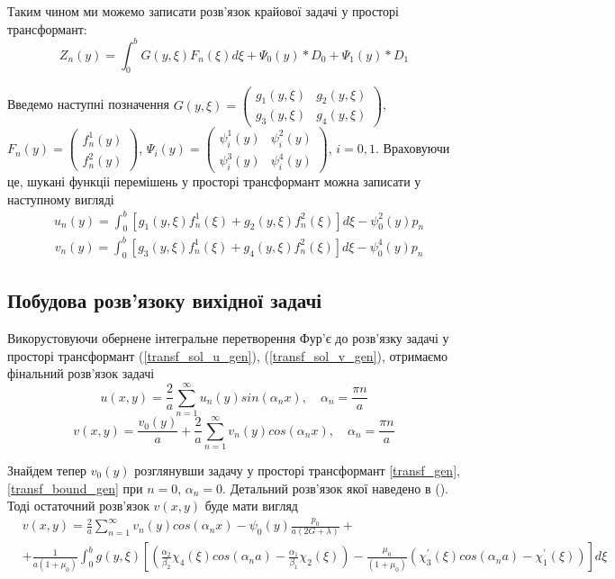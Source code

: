 Таким чином ми можемо записати розв'язок крайової задачі у просторі трансформант:
\begin{equation}
    Z_n(y) = \int_0^b G(y,\xi) F_n(\xi) d\xi + \Psi_0(y) * D_0 + \Psi_1(y) * D_1
\end{equation}

Введемо наступні позначення $G(y, \xi) = \begin{pmatrix}
    g_1(y,\xi) & g_2(y,\xi) \\
    g_3(y,\xi) & g_4(y,\xi)
\end{pmatrix}$, $F_n(y) = \begin{pmatrix}
    f_n^1(y) \\
    f_n^2(y)
\end{pmatrix}$, $\Psi_i(y) = \begin{pmatrix}
    \psi_i^1(y) & \psi_i^2(y) \\
    \psi_i^3(y) & \psi_i^4(y)
\end{pmatrix}$, $i=0,1$. Враховуючи це, шукані функціі перемішень у просторі трансформант можна записати у наступному вигляді
\begin{align}\label{transf_sol_u_gen}
    &u_n(y) = \int_0^b \left[g_1(y, \xi)f_n^1(\xi) + g_2(y, \xi)f_n^2(\xi) \right]d\xi - \psi_0^2(y) p_n
\end{align}
\begin{align}\label{transf_sol_v_gen}
    &v_n(y) = \int_0^b \left[g_3(y, \xi)f_n^1(\xi) + g_4(y, \xi)f_n^2(\xi) \right]d\xi - \psi_0^4(y) p_n
\end{align}

\subsection{Побудова розв'язоку вихідної задачі}
Викорустовуючи обернене інтегральне перетворення Фур'є до розв'язку задачі у просторі трансформант
(\ref{transf_sol_u_gen}), (\ref{transf_sol_v_gen}), отримаємо фінальний розв'язок задачі
\begin{equation}
    u(x,y) = \frac{2}{a} \sum_{n=1}^{\infty} u_n(y) sin(\alpha_n x), \quad \alpha_n = \frac{\pi n}{a}
\end{equation}
\begin{equation}
    v(x,y) = \frac{v_0(y)}{a} + \frac{2}{a} \sum_{n=1}^{\infty} v_n(y) cos(\alpha_n x), \quad \alpha_n = \frac{\pi n}{a}
\end{equation}

Знайдем тепер $v_0(y)$ розглянувши задачу у просторі трансформант \eqref{transf_gen}, \eqref{transf_bound_gen} при $n=0$, $\alpha_n = 0$.
Детальний розв'язок якої наведено в (). Тоді остаточний розв'язок $v(x,y)$ буде мати вигляд
\begin{align}
    &v(x,y) = \frac{2}{a} \sum_{n=1}^{\infty} v_n(y) cos(\alpha_n x) - \psi_0(y) \frac{p_0}{a(2G + \lambda)} + \\
    &+ \frac{1}{a(1+\mu_0)} \int_{0}^{b}g(y,\xi) \left[ (\frac{\alpha_2}{\beta_2}\chi_4(\xi) cos(\alpha_n a) - \frac{\alpha_1}{\beta_1}\chi_2(\xi)) - \frac{\mu_0}{(1+\mu_0)} (\chi_3^{'}(\xi) cos(\alpha_n a) -\chi_1^{'}(\xi)) \right] d\xi
\end{align}

